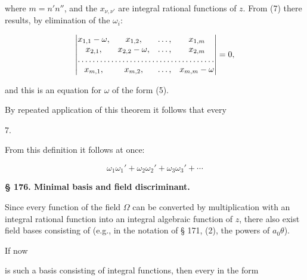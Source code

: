 where $m = n'n''$, and the $x_{\nu,\nu'}$ are integral rational functions of
$z$. From (7) there results, by elimination of the $\omega_i$:

\[
\begin{vmatrix}
x_{1,1} - \omega, & x_{1,2}, & \ldots, & x_{1,m} \\
x_{2,1}, & x_{2,2} - \omega, & \ldots, & x_{2,m} \\
\hdotsfor{4} \\
x_{m,1}, & x_{m,2}, & \ldots, & x_{m,m} - \omega
\end{vmatrix} = 0,
\]

and this is an equation for $\omega$ of the form (5).

By repeated application of this theorem it follows that every

7. 



From this definition it follows at once:




\[
\omega_1 \omega_1' + \omega_2 \omega_2' + \omega_3 \omega_3' + \cdots
\]


\begin{center}
\textbf{§ 176. Minimal basis and field discriminant.}
\end{center}

Since every function of the field $\Omega$ can be converted by multiplication
with an integral rational function into an integral algebraic
function of $z$, there also exist field bases
consisting of  (e.g., in the notation
 of § 171, (2), the powers of $a_0 \theta$).

If now


is such a basis consisting of integral functions, then every
in the form

